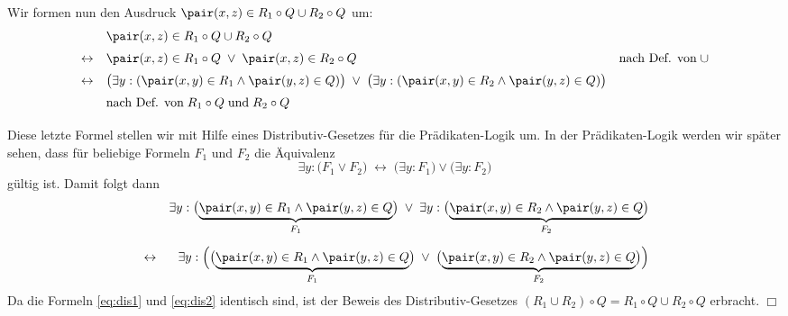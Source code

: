 Wir formen nun den Ausdruck $\pair(x,z) \in R_1 \circ Q \cup R_2 \circ Q$ um:
\[
\begin{array}{cll}
                & \pair(x,z) \in R_1 \circ Q \cup R_2 \circ Q \\[0.2cm]
\leftrightarrow & \pair(x,z) \in R_1 \circ Q \;\vee\; \pair(x,z) \in R_2 \circ Q &
                  \mbox{nach Def. von}\;\cup \\[0.2cm]
\leftrightarrow & \bigl(\exists y: (\pair(x,y) \in R_1 \wedge \pair(y,z) \in Q)\bigr) \;\vee\; 
                  \bigl(\exists y: (\pair(x,y) \in R_2 \wedge \pair(y,z) \in Q)\bigr) \\[0.2cm]
                & \mbox{nach Def. von}\; R_1 \circ Q \; \mbox{und}\; R_2 \circ Q \\[0.2cm]
\end{array}
\]
Diese letzte Formel stellen wir mit Hilfe eines Distributiv-Gesetzes für die
Prädikaten-Logik um.  In der Prädikaten-Logik werden wir später sehen, dass für beliebige
Formeln $F_1$ und $F_2$ die Äquivalenz
\[ \exists y: \bigl(F_1 \vee F_2\bigr) \;\leftrightarrow\; \bigl(\exists y: F_1\bigr) \vee \bigl(\exists y: F_2\bigr) \]
gültig ist.  Damit folgt dann
\begin{eqnarray}
\nonumber
 & & \exists y: \bigl(\underbrace{\pair(x,y) \in R_1 \wedge \pair(y,z) \in Q}_{F_1}\bigr) \;\vee\; 
     \exists y: \bigl(\underbrace{\pair(x,y) \in R_2 \wedge \pair(y,z) \in Q}_{F_2}\bigr) \\[0.2cm]
  \label{eq:dis2}
 & \leftrightarrow &
     \exists y: \Bigl(\bigl(\underbrace{\pair(x,y) \in R_1 \wedge \pair(y,z) \in Q}_{F_1}\bigr) \;\vee\; 
                \bigl(\underbrace{\pair(x,y) \in R_2 \wedge \pair(y,z) \in Q}_{F_2}\bigr)\Bigr) 
\end{eqnarray}
Da die Formeln \ref{eq:dis1} und \ref{eq:dis2} identisch sind, ist der Beweis des
Distributiv-Gesetzes $(R_1 \cup R_2) \circ Q = R_1 \circ Q \cup R_2 \circ Q$
erbracht. \hspace*{\fill} $\Box$


